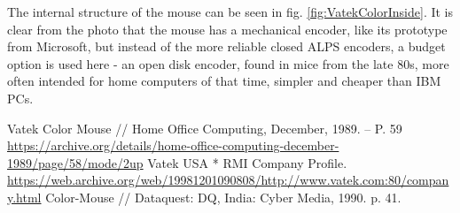 \documentclass[11pt, a4paper]{article}
\begin{document}
The internal structure of the mouse can be seen in fig. \ref{fig:VatekColorInside}. It is clear from the photo that the mouse has a mechanical encoder, like its prototype from Microsoft, but instead of the more reliable closed ALPS encoders, a budget option is used here - an open disk encoder, found in mice from the late 80s, more often intended for home computers of that time, simpler and cheaper than IBM PCs.

\begin{thebibliography}{9}
 Vatek Color Mouse // Home Office Computing, December, 1989. -- P. 59 \url{https://archive.org/details/home-office-computing-december-1989/page/58/mode/2up}
 Vatek USA * RMI Company Profile. \url{https://web.archive.org/web/19981201090808/http://www.vatek.com:80/company.html}
 Color-Mouse // Dataquest: DQ, India: Cyber Media, 1990. p. 41.
\end{thebibliography}
\end{document}
